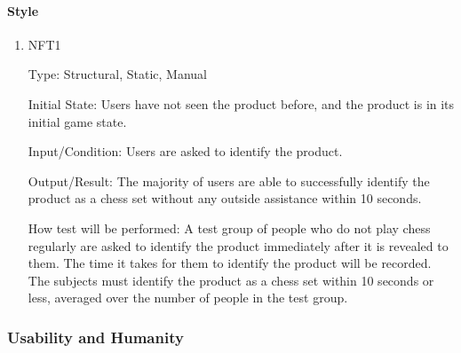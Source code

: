 \documentclass[12pt, titlepage]{article}
\begin{document}
\paragraph{Style}
\begin{enumerate}
    \item{NFT1}
    
        Type: Structural, Static, Manual
                            
        Initial State: Users have not seen the product before, and the product is in its initial game state.
                            
        Input/Condition: Users are asked to identify the product.
                            
        Output/Result: The majority of users are able to successfully identify the product as a chess set without any outside assistance within 10 seconds.
                            
        How test will be performed: A test group of people who do not play chess regularly are asked to identify the product immediately after it is revealed to them.
            The time it takes for them to identify the product will be recorded. The subjects must identify the product as a chess set within 10 seconds or less, averaged
            over the number of people in the test group.
\end{enumerate}

\subsubsection{Usability and Humanity}
\end{document}
